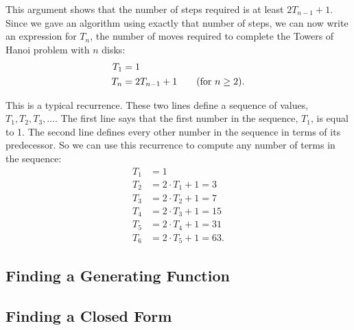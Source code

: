 This argument shows that the number of steps required is at least
$2T_{n-1} + 1$.  Since we gave an algorithm using exactly that number
of steps, we can now write an expression for $T_n$, the number of
moves required to complete the Towers of Hanoi problem with $n$ disks:
\begin{align*}
T_1 & = 1 \\
T_n & = 2T_{n-1} + 1 \text{\qquad (for $n \geq 2$)}.
\end{align*}

This is a typical recurrence.  These two lines define a sequence of
values, $T_1, T_2, T_3, \ldots$.  The first line says that the first
number in the sequence, $T_1$, is equal to 1.  The second line defines
every other number in the sequence in terms of its predecessor.  So we
can use this recurrence to compute any number of terms in the sequence:
\begin{align*}
T_1 & = 1 \\
T_2 & = 2 \cdot T_1 + 1 = 3 \\
T_3 & = 2 \cdot T_2 + 1 = 7 \\
T_4 & = 2 \cdot T_3 + 1 = 15 \\
T_5 & = 2 \cdot T_4 + 1 = 31 \\
T_6 & = 2 \cdot T_5 + 1 = 63.
\end{align*}

\subsection{Finding a Generating Function}

\subsection{Finding a Closed Form}


\begin{problems}
\classproblems
{}

\homeworkproblems
{}

\examproblems
{}

\end{problems}

\label{sec:gf_counting}

